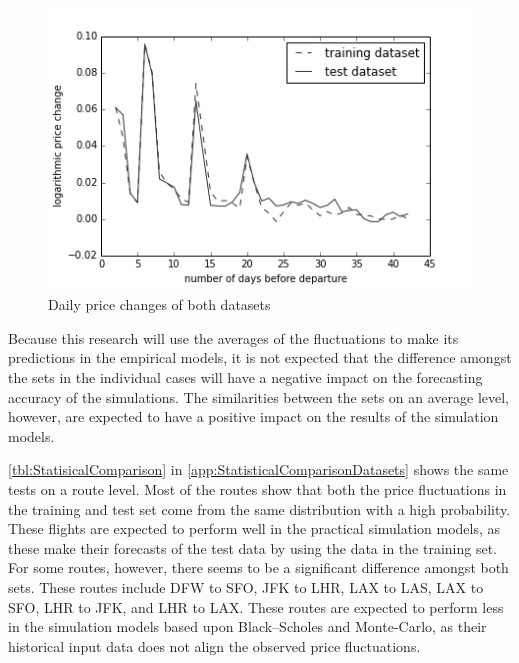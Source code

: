 \begin{figure}
\centering
\includegraphics[width=.8\textwidth]{figures/Train-Test_DailyReturns}
\caption{Daily price changes of both datasets}
\label{fig:DailyPriceChangesBothSets}
\end{figure}


Because this research will use the averages of the fluctuations to make its predictions in the empirical models, it is not expected that the difference amongst the sets in the individual cases will have a negative impact on the forecasting accuracy of the simulations. The similarities between the sets on an average level, however, are expected to have a positive impact on the results of the simulation models.

\autoref{tbl:StatisicalComparison} in \autoref{app:StatisticalComparisonDatasets} shows the same tests on a route level. Most of the routes show that both the price fluctuations in the training and test set come from the same distribution with a high probability. These flights are expected to perform well in the practical simulation models, as these make their forecasts of the test data by using the data in the training set. For some routes, however, there seems to be a significant difference amongst both sets. These routes include DFW to SFO, JFK to LHR, LAX to LAS, LAX to SFO, LHR to JFK, and LHR to LAX. These routes are expected to perform less in the simulation models based upon Black--Scholes and Monte-Carlo, as their historical input data does not align the observed price fluctuations.


